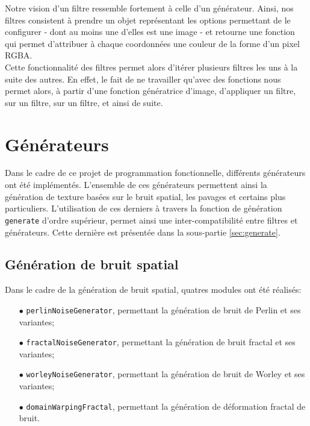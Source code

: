 \documentclass[11pt]{article}
\begin{document}
Notre vision d'un filtre ressemble fortement à celle d'un générateur. Ainsi, nos filtres consistent à prendre un objet représentant les options permettant de le configurer - dont au moins une d'elles est une image - et retourne une fonction qui permet d'attribuer à chaque coordonnées une couleur de la forme d'un pixel RGBA. \\

Cette fonctionnalité des filtres permet alors d'itérer plusieurs filtres les uns à la suite des autres. En effet, le fait de ne travailler qu'avec des fonctions nous permet alors, à partir d'une fonction génératrice d'image, d'appliquer un filtre, sur un filtre, sur un filtre, et ainsi de suite.

\newpage
\section{Générateurs}
\label{section:generators}

Dans le cadre de ce projet de programmation fonctionnelle, différents générateurs ont été implémentés. L'ensemble de ces générateurs permettent ainsi la génération de texture basées sur le bruit spatial, les pavages et certains plus particuliers. L'utilisation de ces derniers à travers la fonction de génération \texttt{generate} d'ordre supérieur, permet ainsi une inter-compatibilité entre filtres et générateurs. Cette dernière est présentée dans la sous-partie \ref{sec:generate}.

\subsection{Génération de bruit spatial}
\label{section:noiseGenerationIntro}

Dans le cadre de la génération de bruit spatial, quatres modules ont été réalisés:
\begin{itemize}
    \item [$\bullet$] \texttt{perlinNoiseGenerator}, permettant la génération de bruit de Perlin et ses variantes;
    \item [$\bullet$] \texttt{fractalNoiseGenerator}, permettant la génération de bruit fractal et ses variantes;
    \item [$\bullet$] \texttt{worleyNoiseGenerator}, permettant la génération de bruit de Worley et ses variantes;
    \item [$\bullet$] \texttt{domainWarpingFractal}, permettant la génération de déformation fractal de bruit.
\end{itemize}
\end{document}
